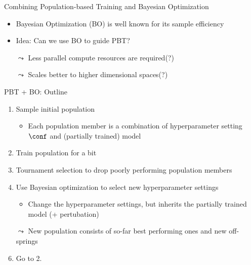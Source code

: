 \begin{frame}[c]{Combining Population-based Training and Bayesian Optimization}

\begin{itemize}
	\item Bayesian Optimization (BO) is well known for its sample efficiency
	\pause
	\medskip
	\item \alert{Idea:} Can we use BO to guide PBT? 
	\pause
	\medskip
	\item[$\leadsto$] Less parallel compute resources are required(?)
	\pause
	\medskip
	\item[$\leadsto$] Scales better to higher dimensional spaces(?)
\end{itemize}

\end{frame}
\begin{frame}[c]{PBT + BO: Outline}

\begin{enumerate}
	\item Sample initial population
	\begin{itemize}
		\item Each population member is a combination of hyperparameter setting $\conf$ and (partially trained) model
	\end{itemize}
	\item Train population for a bit 
	\item Tournament selection to drop poorly performing population members
	\item Use \alert{Bayesian optimization} to select new hyperparameter settings
	\begin{itemize}
		\item Change the hyperparameter settings, but inherits the partially trained model (+ pertubation)
	\end{itemize}
	\item[$\leadsto$] New population consists of so-far best performing ones and new off-springs
	\item Go to 2.
\end{enumerate}


\end{frame}
